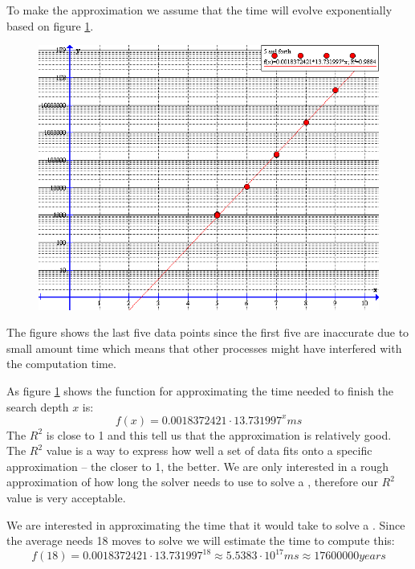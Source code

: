 To make the approximation we assume that the time will evolve exponentially based on figure \ref{fig:timeFunction}.

\begin{figure}[htb]
	\centering
		\includegraphics[scale=0.5]{input/pics/timeFunction}
	\caption{}
	\label{fig:timeFunction}
\end{figure}

The figure shows the last five data points since the first five are inaccurate due to small amount time which means that other processes might have interfered with the computation time.

As figure \ref{fig:timeFunction} shows the function for approximating the time needed to finish the search depth $x$ is:
\[
f(x)=0.0018372421 \cdot 13.731997^{x} ms
\]
The $R^2$ is close to 1 and this tell us that the approximation is relatively good. The $R^2$ value is a way to express how well a set of data fits onto a specific approximation -- the closer to 1, the better. We are only interested in a rough approximation of how long the solver needs to use to solve a \rubik{}, therefore our $R^2$ value is very acceptable.

We are interested in approximating the time that it would take to solve a \rubik{}. Since the average \rubik{} needs 18 moves to solve \cite{kociemba09} we will estimate the time to compute this:
\[
f(18) = 0.0018372421 \cdot 13.731997^{18} \approx 5.5383 \cdot 10^{17} ms \approx 17600000 years
\]

